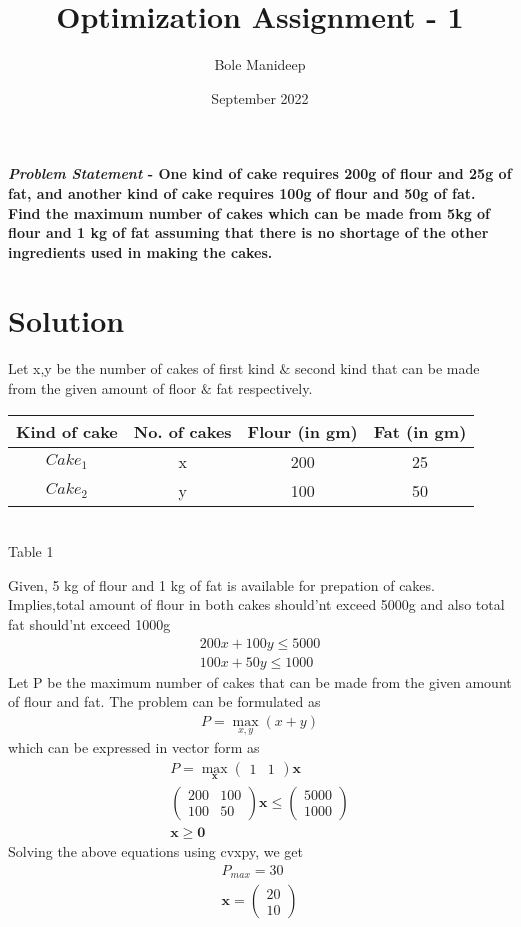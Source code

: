 \documentclass[10pt,twocolumn]{article}
\title{\textbf{Optimization Assignment - 1}}
\author{Bole Manideep}
\date{September 2022}
\let\vec\mathbf
\newcommand{\myvec}[1]{\ensuremath{\begin{pmatrix}#1\end{pmatrix}}}
\begin{document}
\maketitle
\paragraph{\textit{Problem Statement} - One kind of cake requires 200g of flour and 25g of fat, and another kind of cake requires 100g of flour and 50g of fat. Find the maximum number of cakes which can be made from 5kg of flour and 1 kg of fat assuming that there is no shortage of the other ingredients used in making the cakes.} 

\section*{\large Solution}
Let x,y be the number of cakes of first kind $\&$ second kind that can be made from the given amount of floor $\&$ fat respectively.
\begin{center}
    \setlength{\arrayrulewidth}{0.1mm}
	\setlength{\tabcolsep}{2pt}
	\renewcommand{\arraystretch}{2}
\begin{tabular}{|c|c|c|c|}
	\hline 
    \textbf{Kind of cake} & \textbf{No. of cakes} & \textbf{Flour (in gm)} & \textbf{Fat (in gm)} \\ \hline
    $Cake_1$ & x &  200 & 25 \\ \hline
    $Cake_2$ & y & 100 & 50  \\ \hline
\end{tabular}\\ \vspace{2mm}
\hspace{1cm} Table 1
\end{center}
Given, 5 kg of flour and 1 kg of fat is available for prepation of cakes. \\
Implies,total amount of flour in both cakes should'nt exceed 5000g and also total fat should'nt exceed 1000g
\begin{align}
200x + 100y \leq 5000 \\
100x + 50y \leq 1000
\end{align}
Let P be the maximum number of cakes that can be made from the given amount of flour and fat. The problem can be formulated as
\begin{align}
	P = \max_{x,y}(x+y)
\end{align}
which can be expressed in vector form as
\begin{align}
	P = \max_{\vec{x}}\myvec{1&1}\vec{x}\\
	\myvec{200 & 100 \\ 100 & 50}\vec{x} \leq \myvec{5000 \\ 1000}\\
	\vec{x} \geq \vec{0}
\end{align}
Solving the above equations using cvxpy, we get
\begin{align}
	P_{max} = 30 \\
	\vec{x} = \myvec{20 \\ 10}
\end{align}
\end{document}
